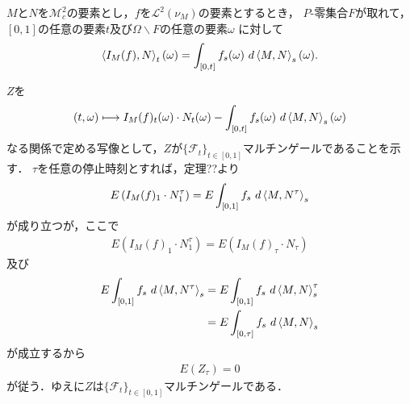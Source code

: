 	\begin{screen}
		\begin{thm}
			$M$と$N$を$\mathscr{M}_{c}^{2}$の要素とし，$f$を$\mathscr{L}^{2}(\nu_{M})$の要素とするとき，
			$P$-零集合$F$が取れて，$[0,1]$の任意の要素$t$及び$\Omega \backslash F$の任意の要素$\omega$
			に対して
			\begin{align}
				\inprod<I_{M}(f),N>_{t}(\omega)
				= \int_{[0,t]} f_{s}(\omega)\ d\inprod<M,N>_{s}(\omega).
			\end{align}
		\end{thm}
	\end{screen}
	
	\begin{sketch}
		$Z$を
		\begin{align}
			(t,\omega) \longmapsto I_{M}(f)_{t}(\omega) \cdot N_{t}(\omega)
			- \int_{[0,t]} f_{s}(\omega)\ d\inprod<M,N>_{s}(\omega)
		\end{align}
		なる関係で定める写像として，$Z$が$\{\mathscr{F}_{t}\}_{t \in [0,1]}$マルチンゲールであることを示す．
		$\tau$を任意の停止時刻とすれば，定理??より
		\begin{align}
			E\left(I_{M}(f)_{1} \cdot N^{\tau}_{1}\right)
			= E\int_{[0,1]} f_{s}\ d\inprod<M,N^{\tau}>_{s}
		\end{align}
		が成り立つが，ここで
		\begin{align}
			E\left(I_{M}(f)_{1} \cdot N^{\tau}_{1}\right)
			= E\left(I_{M}(f)_{\tau} \cdot N_{\tau}\right)
		\end{align}
		及び
		\begin{align}
			E\int_{[0,1]} f_{s}\ d\inprod<M,N^{\tau}>_{s}
			&= E\int_{[0,1]} f_{s}\ d\inprod<M,N>^{\tau}_{s} \\
			&= E\int_{[0,\tau]} f_{s}\ d\inprod<M,N>_{s}
		\end{align}
		が成立するから
		\begin{align}
			E(Z_{\tau}) = 0
		\end{align}
		が従う．ゆえに$Z$は$\{\mathscr{F}_{t}\}_{t \in [0,1]}$マルチンゲールである．
	\end{sketch}